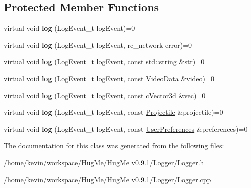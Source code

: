 \subsection*{Protected Member Functions}
\begin{DoxyCompactItemize}
\item 
\hypertarget{classLogger_a801f41e68772457e9635c68e951cc0f1}{
virtual void {\bfseries log} (LogEvent\_\-t logEvent)=0}
\label{classLogger_a801f41e68772457e9635c68e951cc0f1}

\item 
\hypertarget{classLogger_a2c18b2cbcb7338768d69fc710e1553f5}{
virtual void {\bfseries log} (LogEvent\_\-t logEvent, rc\_\-network error)=0}
\label{classLogger_a2c18b2cbcb7338768d69fc710e1553f5}

\item 
\hypertarget{classLogger_a33d4f1b5211dccdf685210244ccbed15}{
virtual void {\bfseries log} (LogEvent\_\-t logEvent, const std::string \&str)=0}
\label{classLogger_a33d4f1b5211dccdf685210244ccbed15}

\item 
\hypertarget{classLogger_aa7be835d8810ab03f57d11c040ed01ee}{
virtual void {\bfseries log} (LogEvent\_\-t logEvent, const \hyperlink{structVideoData}{VideoData} \&video)=0}
\label{classLogger_aa7be835d8810ab03f57d11c040ed01ee}

\item 
\hypertarget{classLogger_a0bfc30bba95fbd89495e9a2f0f1672a3}{
virtual void {\bfseries log} (LogEvent\_\-t logEvent, const cVector3d \&vec)=0}
\label{classLogger_a0bfc30bba95fbd89495e9a2f0f1672a3}

\item 
\hypertarget{classLogger_a2ce2fc72be31a47bc11c023c2ed0ac71}{
virtual void {\bfseries log} (LogEvent\_\-t logEvent, const \hyperlink{classProjectile}{Projectile} \&projectile)=0}
\label{classLogger_a2ce2fc72be31a47bc11c023c2ed0ac71}

\item 
\hypertarget{classLogger_af36c61a9def35ee2e9bf4929f5633e90}{
virtual void {\bfseries log} (LogEvent\_\-t logEvent, const \hyperlink{structUserPreferences}{UserPreferences} \&preferences)=0}
\label{classLogger_af36c61a9def35ee2e9bf4929f5633e90}

\end{DoxyCompactItemize}


The documentation for this class was generated from the following files:\begin{DoxyCompactItemize}
\item 
/home/kevin/workspace/HugMe/HugMe v0.9.1/Logger/Logger.h\item 
/home/kevin/workspace/HugMe/HugMe v0.9.1/Logger/Logger.cpp\end{DoxyCompactItemize}
